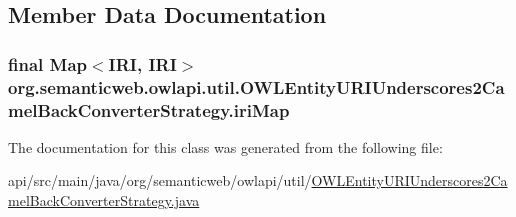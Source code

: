 \subsection{Member Data Documentation}
\hypertarget{classorg_1_1semanticweb_1_1owlapi_1_1util_1_1_o_w_l_entity_u_r_i_underscores2_camel_back_converter_strategy_a1e33c1e6269a4e037fc28f11563c145c}{
\subsubsection[{iri\-Map}]{\setlength{\rightskip}{0pt plus 5cm}final Map$<${\bf I\-R\-I}, {\bf I\-R\-I}$>$ org.\-semanticweb.\-owlapi.\-util.\-O\-W\-L\-Entity\-U\-R\-I\-Underscores2\-Camel\-Back\-Converter\-Strategy.\-iri\-Map\hspace{0.3cm}{\ttfamily [private]}}}\label{classorg_1_1semanticweb_1_1owlapi_1_1util_1_1_o_w_l_entity_u_r_i_underscores2_camel_back_converter_strategy_a1e33c1e6269a4e037fc28f11563c145c}


The documentation for this class was generated from the following file\-:\begin{DoxyCompactItemize}
\item 
api/src/main/java/org/semanticweb/owlapi/util/\hyperlink{_o_w_l_entity_u_r_i_underscores2_camel_back_converter_strategy_8java}{O\-W\-L\-Entity\-U\-R\-I\-Underscores2\-Camel\-Back\-Converter\-Strategy.\-java}\end{DoxyCompactItemize}
